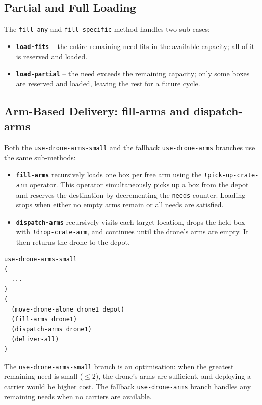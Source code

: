 \documentclass{article}
\begin{document}
\subsection{Partial and Full Loading}

The \texttt{fill-any} and \texttt{fill-specific} method handles two sub-cases:

\begin{itemize}
    \item \textbf{\texttt{load-fits}} -- the entire remaining need fits in the available capacity; all of it is reserved and loaded.
    \item \textbf{\texttt{load-partial}} -- the need exceeds the remaining capacity; only some boxes are reserved and loaded, leaving the rest for a future cycle.
\end{itemize}

\subsection{Arm-Based Delivery: fill-arms and dispatch-arms}

Both the \texttt{use-drone-arms-small} and the fallback \texttt{use-drone-arms} branches use the same sub-methods:

\begin{itemize}
    \item \textbf{\texttt{fill-arms}} recursively loads one box per free arm using the \texttt{!pick-up-crate-arm} operator. This operator simultaneously picks up a box from the depot and reserves the destination by decrementing the \texttt{needs} counter. Loading stops when either no empty arms remain or all needs are satisfied.
    \item \textbf{\texttt{dispatch-arms}} recursively visits each target location, drops the held box with \texttt{!drop-crate-arm}, and continues until the drone's arms are empty. It then returns the drone to the depot.
\end{itemize}

\begin{lstlisting}[caption={Arm-based delivery flow in deliver-all}]
use-drone-arms-small  
(
  ...
)
(
  (move-drone-alone drone1 depot)
  (fill-arms drone1)       
  (dispatch-arms drone1)   
  (deliver-all)            
)
\end{lstlisting}

The \texttt{use-drone-arms-small} branch is an optimisation: when the greatest remaining need is small ($\leq 2$), the drone's arms are sufficient, and deploying a carrier would be higher cost. The fallback \texttt{use-drone-arms} branch handles any remaining needs when no carriers are available.
\end{document}
